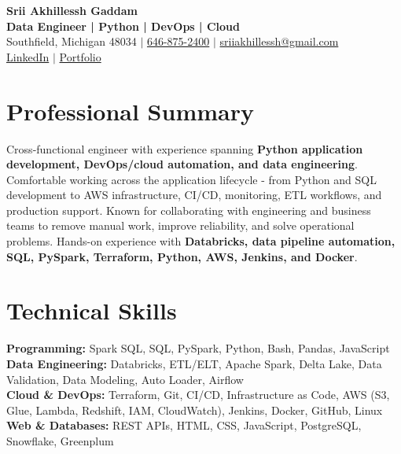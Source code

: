 \documentclass[letterpaper,10pt]{article}
\begin{document}
\fontsize{9.35pt}{10.45pt}\selectfont

\begin{center}
    {\LARGE \textbf{Srii Akhillessh Gaddam}} \\[-1pt]
    \textbf{Data Engineer | Python | DevOps | Cloud} \\[2pt]
    Southfield, Michigan 48034 $|$
    \href{tel:6468752400}{646-875-2400} $|$
    \href{mailto:sriiakhillessh@gmail.com}{sriiakhillessh@gmail.com} \\[1pt]
    \href{https://www.linkedin.com/in/srii-akhiilessh-gaddam-b48668191/}{LinkedIn} $|$
    \href{https://sriiakhillesshg.github.io/portfolio/}{Portfolio}
\end{center}
\vspace{-8pt}

\section{Professional Summary}
\small{Cross-functional engineer with experience spanning \textbf{Python application development, DevOps/cloud automation, and data engineering}. Comfortable working across the application lifecycle - from Python and SQL development to AWS infrastructure, CI/CD, monitoring, ETL workflows, and production support. Known for collaborating with engineering and business teams to remove manual work, improve reliability, and solve operational problems. Hands-on experience with \textbf{Databricks, data pipeline automation, SQL, PySpark, Terraform, Python, AWS, Jenkins, and Docker}.}

\section{Technical Skills}
\small{
\textbf{Programming:} Spark SQL, SQL, PySpark, Python, Bash, Pandas, JavaScript \\
\textbf{Data Engineering:} Databricks, ETL/ELT, Apache Spark, Delta Lake, Data Validation, Data Modeling, Auto Loader, Airflow \\
\textbf{Cloud \& DevOps:} Terraform, Git, CI/CD, Infrastructure as Code, AWS (S3, Glue, Lambda, Redshift, IAM, CloudWatch), Jenkins, Docker, GitHub, Linux \\
\textbf{Web \& Databases:} REST APIs, HTML, CSS, JavaScript, PostgreSQL, Snowflake, Greenplum
}
\end{document}
